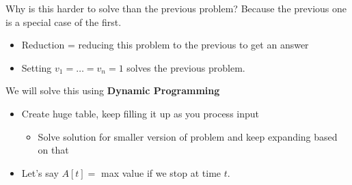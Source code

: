 \documentclass[11pt]{article}
\begin{document}
Why is this harder to solve than the previous problem? Because the previous one is a special case of the first.
\begin{itemize}
\item Reduction = reducing this problem to the previous to get an answer
\item Setting \(v_1=\ldots=v_n=1\) solves the previous problem.
\end{itemize}
We will solve this using \textbf{Dynamic Programming}
\begin{itemize}
\item Create huge table, keep filling it up as you process input
\begin{itemize}
\item Solve solution for smaller version of problem and keep expanding based on that
\end{itemize}
\item Let's say \(A[t]=\) max value if we stop at time \(t\).
\end{itemize}
\end{document}
